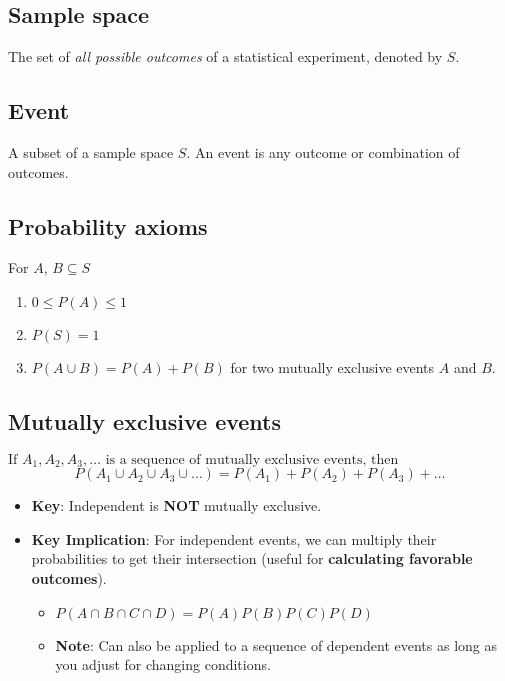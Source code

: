 \subsection{Sample space}
    \begin{definition}
        The set of \emph{all possible outcomes} of a statistical experiment, denoted by $S$.
    \end{definition}

\subsection{Event}
    \begin{definition}
        A subset of a sample space $S$. An event is any outcome or combination of outcomes.
    \end{definition}

\subsection{Probability axioms}
    \begin{definition}
        For $A$, $B \subseteq S$
        \begin{enumerate}
            \item $0 \leq P(A) \leq 1$
            \item $P(S) = 1$
            \item $P(A \cup B) = P(A) + P(B)$ for two mutually exclusive events $A$ and $B$. 
        \end{enumerate}
    \end{definition}

\subsection{Mutually exclusive events}
\begin{definition}
    $\text{If } A_1, A_2, A_3, \dots \text{ is a sequence of mutually exclusive events, then}$
    \begin{equation}
        P(A_1 \cup A_2 \cup A_3 \cup \dots) = P(A_1) + P(A_2) + P(A_3) + \dots    
    \end{equation}
    \begin{itemize}
        \item \textbf{Key}: Independent is \textbf{NOT} mutually exclusive.
        \item \textbf{Key Implication}: For independent events, we can multiply their probabilities to get their intersection (useful for \textbf{calculating favorable outcomes}).
        \begin{itemize}
            \item \( P(A \cap B \cap C \cap D) = P(A)P(B)P(C)P(D) \) 
            \item \textbf{Note}: Can also be applied to a sequence of dependent events as long as you adjust for changing conditions.
        \end{itemize}
    \end{itemize}
\end{definition}

